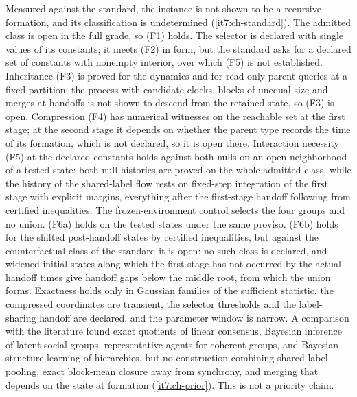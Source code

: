 \documentclass[11pt,letterpaper]{report}
\begin{document}
Measured against the standard, the instance is not shown to be a recursive formation, and its classification is undetermined (\cref{it7:ch-standard}). The admitted class is open in the full grade, so (F1) holds. The selector is declared with single values of its constants; it meets (F2) in form, but the standard asks for a declared set of constants with nonempty interior, over which (F5) is not established. Inheritance (F3) is proved for the dynamics and for read-only parent queries at a fixed partition; the process with candidate clocks, blocks of unequal size and merges at handoffs is not shown to descend from the retained state, so (F3) is open. Compression (F4) has numerical witnesses on the reachable set at the first stage; at the second stage it depends on whether the parent type records the time of its formation, which is not declared, so it is open there. Interaction necessity (F5) at the declared constants holds against both nulls on an open neighborhood of a tested state: both null histories are proved on the whole admitted class, while the history of the shared-label flow rests on fixed-step integration of the first stage with explicit margins, everything after the first-stage handoff following from certified inequalities. The frozen-environment control selects the four groups and no union. (F6a) holds on the tested states under the same proviso. (F6b) holds for the shifted post-handoff states by certified inequalities, but against the counterfactual class of the standard it is open: no such class is declared, and widened initial states along which the first stage has not occurred by the actual handoff times give handoff gaps below the middle root, from which the union forms. Exactness holds only in Gaussian families of the sufficient statistic, the compressed coordinates are transient, the selector thresholds and the label-sharing handoff are declared, and the parameter window is narrow. A comparison with the literature found exact quotients of linear consensus, Bayesian inference of latent social groups, representative agents for coherent groups, and Bayesian structure learning of hierarchies, but no construction combining shared-label pooling, exact block-mean closure away from synchrony, and merging that depends on the state at formation (\cref{it7:ch-prior}). This is not a priority claim.
\end{document}

